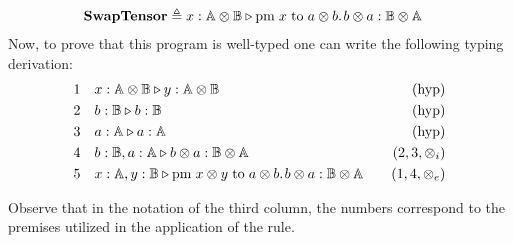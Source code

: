 \begin{example}
\begin{comment}
\end{split}
\end{equation*}
\end{comment}
\begin{equation*}
\begin{split}
&  \textbf{SwapTensor} \triangleq x : \mathbb{A} \otimes  \mathbb{B}  \triangleright \text{pm} \hspace{3 pt} x \hspace{3 pt} \text{to} \hspace{3 pt} a \otimes b. \hspace{1pt} b \otimes a : \mathbb{B} \otimes \mathbb{A}
\end{split}
\end{equation*}
Now, to prove that this program is well-typed one can write the following typing derivation:
\begin{equation*}
\begin{split}
1 \hspace{10 pt} & x : \mathbb{A} \otimes \mathbb{B} \triangleright   y : \mathbb{A} \otimes \mathbb{B} \hspace{10 pt} & {(\text{hyp})} \\
2 \hspace{10 pt} &  b : \mathbb{B} \triangleright   b : \mathbb{B} \hspace{10 pt}&{(\text{hyp})} \\
3 \hspace{10 pt} &   a : \mathbb{A} \triangleright  a : \mathbb{A} \hspace{10 pt}&{(\text{hyp})} \\
4 \hspace{10 pt} &   b : \mathbb{B},a : \mathbb{A} \triangleright b \otimes a : \mathbb{B} \otimes \mathbb{A} \hspace{10pt} &\text{($2,3,\otimes_i$)} \\
5\hspace{10 pt}& x : \mathbb{A},  y : \mathbb{B} \triangleright \text{pm} \hspace{3 pt} x \otimes y\hspace{3 pt} \text{to} \hspace{3 pt} a \otimes b. \hspace{1pt} b \otimes a : \mathbb{B} \otimes \mathbb{A}& \hspace{10pt} \text{($1,4,\otimes_e$)}
\end{split}
\end{equation*}


Observe that in the notation of the third column, the numbers correspond to the premises utilized in the application of the rule.
\end{example}


